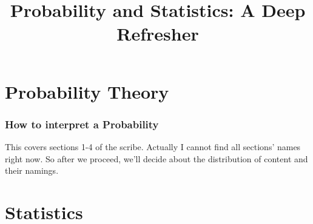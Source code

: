 \documentclass{article}
\title{Probability and Statistics: A Deep Refresher}
\begin{document}
\maketitle
\tableofcontents
\part{Probability Theory}
\section{How to interpret a Probability}
This covers sections 1-4 of the scribe. Actually I cannot find all sections' names right now. So after we proceed, we'll decide about the distribution of content and their namings.


\part{Statistics}
\end{document}
